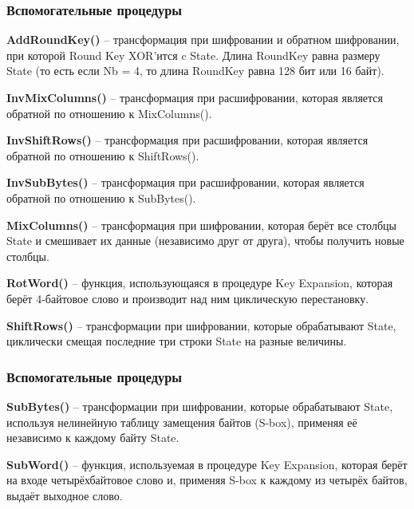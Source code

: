 \documentclass[10pt, typeface=serif(roman), pdf,hyperref={unicode}, aspectratio=169]{beamer}
\begin{document}
\begin{frame}
	
	\begin{description}
		\frametitle{Вспомогательные процедуры}
		\item \textbf{AddRoundKey() } -- трансформация при шифровании и обратном шифровании, при которой Round Key XOR’ится c State. Длина RoundKey равна размеру State (то есть если Nb = 4, то длина RoundKey равна 128 бит или 16 байт).
		\item \textbf{InvMixColumns()} -- трансформация при расшифровании, которая является обратной по отношению к MixColumns().
		\item \textbf{InvShiftRows()} -- трансформация при расшифровании, которая является обратной по отношению к ShiftRows().
		\item \textbf{InvSubBytes()} -- трансформация при расшифровании, которая является обратной по отношению к SubBytes().
		\item \textbf{MixColumns()} -- трансформация при шифровании, которая берёт все столбцы State и смешивает их данные (независимо друг от друга), чтобы получить новые столбцы.
	\end{description}
	
\end{frame}
		
		
		
\begin{frame}
	
	\begin{description}
		\item \textbf{RotWord()} -- функция, использующаяся в процедуре Key Expansion, которая берёт 4-байтовое слово и производит над ним циклическую перестановку.
		\item \textbf{ShiftRows()} -- трансформации при шифровании, которые обрабатывают State, циклически смещая последние три строки State на разные величины.
		\frametitle{Вспомогательные процедуры}
		\item \textbf{SubBytes()} -- трансформации при шифровании, которые обрабатывают State, используя нелинейную таблицу замещения байтов (S-box), применяя её независимо к каждому байту State.
		\item \textbf{SubWord()} -- функция, используемая в процедуре Key Expansion, которая берёт на входе четырёхбайтовое слово и, применяя S-box к каждому из четырёх байтов, выдаёт выходное слово.
	\end{description}

\end{frame}
\end{document}
